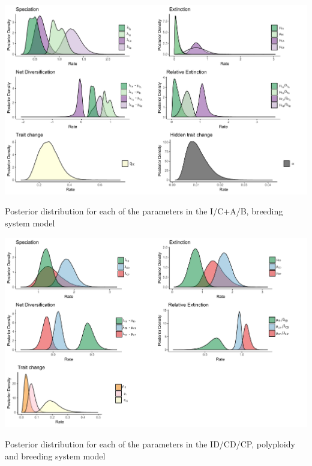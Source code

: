 \begin{suppfigure}
\includegraphics[width=\textwidth]{hisseSInoretposteriordist.pdf}
\caption{Posterior distribution for each of the parameters in the I/C+A/B, breeding system model} %
\label{suppfigure:ICAB}
\end{suppfigure}

\begin{suppfigure}
\includegraphics[width=\textwidth]{musseDPSInodipposteriordist.pdf}
\caption{Posterior distribution for each of the parameters in the ID/CD/CP, polyploidy and breeding system model} %
\label{suppfigure:IDCDCPnodip}
\end{suppfigure}

